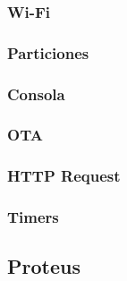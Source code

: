 
\subsubsection{Wi-Fi}


\subsubsection{Particiones}


\subsubsection{Consola}


\subsubsection{OTA}


\subsubsection{HTTP Request}
\subsubsection{Timers}

\subsection{Proteus}

